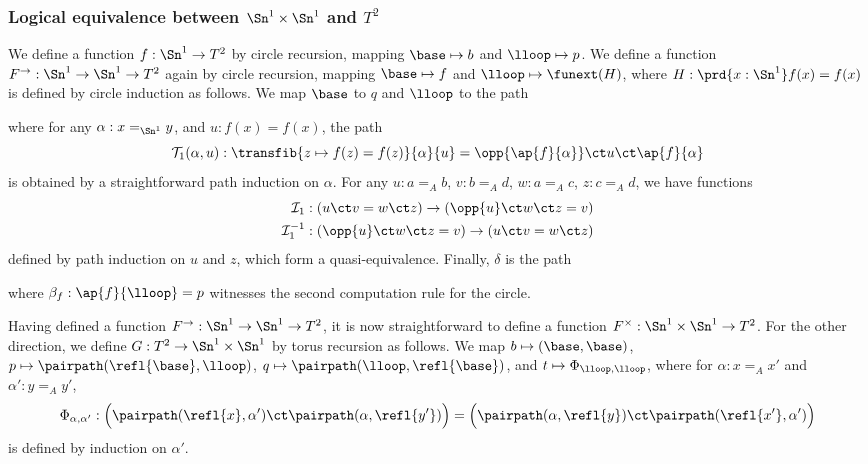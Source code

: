 \documentclass[
%
%
11pt %
]{article}
\newcommand{\Tgh}[2]{\mathcal{T}_1(#1,#2)}
\newcommand{\I}{\mathcal{I}_1}
\begin{document}
\subsubsection*{Logical equivalence between $\Sn^1 \times \Sn^1$ and $T^2$}
We define a function $f : \Sn^1 \to T^2$ by circle recursion, mapping $\base \mapsto b$ and $\lloop \mapsto p$. We define a function $F^\to : \Sn^1 \to \Sn^1 \to T^2$ again by circle recursion, mapping $\base \mapsto f$ and $\lloop \mapsto \funext(H)$, where $H : \prd{x:\Sn^1} f(x) = f(x)$ is defined by circle induction as follows. We map $\base$ to $q$ and $\lloop$ to the path
\begin{center}
\end{center}
where for any $\alpha : x =_{\Sn^1} y$, and $u : f(x) = f(x)$, the path \[\Tgh{\alpha}{u} : \transfib{z \mapsto f(z) = f(z)}{\alpha}{u} = \opp{\ap{f}{\alpha}} \ct u \ct \ap{f}{\alpha} \]
is obtained by a straightforward path induction on $\alpha$. For any $u : a =_A b$, $v : b =_A d$, $w : a =_A c$, $z : c =_A d$, we have functions
\begin{align*}
\I & : (u \ct v = w \ct z) \to (\opp{u} \ct w \ct z = v)\\
\I^{-1} & : (\opp{u} \ct w \ct z = v) \to (u \ct v = w \ct z)
\end{align*}
defined by path induction on $u$ and $z$, which form a quasi-equivalence. Finally, $\delta$ is the path
\begin{center}
\end{center}
where $\beta_f : \ap{f}{\lloop} = p$ witnesses the second computation rule for the circle.

Having defined a function $F^\to : \Sn^1 \to \Sn^1 \to T^2$, it is now straightforward to define a function $F^\times : \Sn^1 \times \Sn^1 \to T^2$. For the other direction, we define $G : T^2 \to \Sn^1 \times \Sn^1$ by torus recursion as follows. We map $b \mapsto (\base,\base)$, $p \mapsto \pairpath(\refl{\base},\lloop)$, $q \mapsto \pairpath(\lloop, \refl{\base})$, and $t \mapsto \Phi_{\lloop,\lloop}$, where for $\alpha : x =_A x'$ and $\alpha' : y =_A y'$,
\[ \Phi_{\alpha,\alpha'} : \Big(\pairpath(\refl{x},\alpha') \ct \pairpath(\alpha, \refl{y'})\Big) = \Big(\pairpath(\alpha, \refl{y}) \ct \pairpath(\refl{x'},\alpha')\Big) \]
is defined by induction on $\alpha'$.
\end{document}
